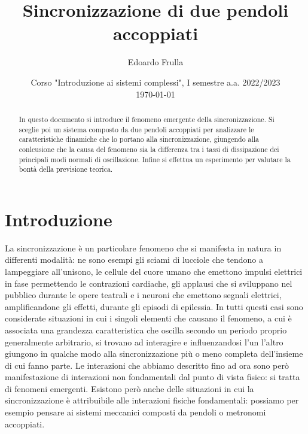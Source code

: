\documentclass[11pt, a4paper, twoside, italian]{article}
\author{Edoardo Frulla}
\date{Corso "Introduzione ai sistemi complessi", I semestre a.a. 2022/2023 \\ \vspace{0.3cm} \today}
\title{Sincronizzazione di due pendoli accoppiati}
\begin{document}
\maketitle
    \begin{abstract}
        In questo documento si introduce il fenomeno emergente della sincronizzazione.
        Si sceglie poi un sistema composto da due pendoli accoppiati per analizzare le caratteristiche
        dinamiche che lo portano alla sincronizzazione, giungendo alla conlcusione che
        la causa del fenomeno sia la differenza tra i tassi di dissipazione dei principali
        modi normali di oscillazione.
        Infine si effettua un esperimento per valutare la bontà della previsione teorica.
    \end{abstract}

\section{Introduzione}
La sincronizzazione è un particolare fenomeno che si manifesta in natura in differenti modalità: ne sono esempi gli sciami di lucciole che tendono a lampeggiare all'unisono, le cellule del cuore umano che emettono impulsi elettrici in fase permettendo le contrazioni cardiache, gli applausi che si sviluppano nel pubblico durante le opere teatrali e i neuroni che emettono segnali elettrici, amplificandone gli effetti, durante gli episodi di epilessia.
In tutti questi casi sono considerate situazioni in cui i singoli elementi che causano il fenomeno, a cui è associata una grandezza caratteristica che oscilla secondo un periodo proprio generalmente arbitrario, si trovano ad interagire e influenzandosi l'un l'altro giungono in qualche modo alla sincronizzazione più o meno completa dell'insieme di cui fanno parte.
Le interazioni che abbiamo descritto fino ad ora sono però manifestazione di interazioni non fondamentali dal punto di vista fisico: si tratta di fenomeni emergenti. 
Esistono però anche delle situazioni in cui la sincronizzazione è attribuibile alle interazioni fisiche fondamentali: possiamo per esempio pensare ai sistemi meccanici composti da pendoli o metronomi accoppiati.
\end{document}
